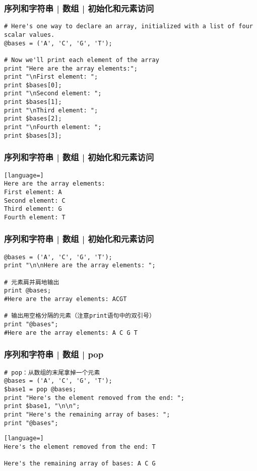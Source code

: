 \begin{frame}[fragile]
  \frametitle{序列和字符串 | 数组 | \alert{初始化和元素访问}}
\begin{lstlisting}
# Here's one way to declare an array, initialized with a list of four scalar values.
@bases = ('A', 'C', 'G', 'T');

# Now we'll print each element of the array
print "Here are the array elements:";
print "\nFirst element: ";
print $bases[0];
print "\nSecond element: ";
print $bases[1];
print "\nThird element: ";
print $bases[2];
print "\nFourth element: ";
print $bases[3];
\end{lstlisting}
\end{frame}

\begin{frame}[fragile]
  \frametitle{序列和字符串 | 数组 | 初始化和元素访问}
\begin{lstlisting}[language=]
Here are the array elements:
First element: A
Second element: C
Third element: G
Fourth element: T
\end{lstlisting}
\end{frame}

\begin{frame}[fragile]
  \frametitle{序列和字符串 | 数组 | \alert{初始化和元素访问}}
\begin{lstlisting}
@bases = ('A', 'C', 'G', 'T');
print "\n\nHere are the array elements: ";

# 元素肩并肩地输出
print @bases;
#Here are the array elements: ACGT

# 输出用空格分隔的元素（注意print语句中的双引号）
print "@bases";
#Here are the array elements: A C G T
\end{lstlisting}
\end{frame}

\begin{frame}[fragile]
  \frametitle{序列和字符串 | 数组 | \alert{pop}}
\begin{lstlisting}
# pop：从数组的末尾拿掉一个元素
@bases = ('A', 'C', 'G', 'T');
$base1 = pop @bases;
print "Here's the element removed from the end: ";
print $base1, "\n\n";
print "Here's the remaining array of bases: ";
print "@bases";
\end{lstlisting}
\pause
\begin{lstlisting}[language=]
Here's the element removed from the end: T

Here's the remaining array of bases: A C G
\end{lstlisting}
\end{frame}

